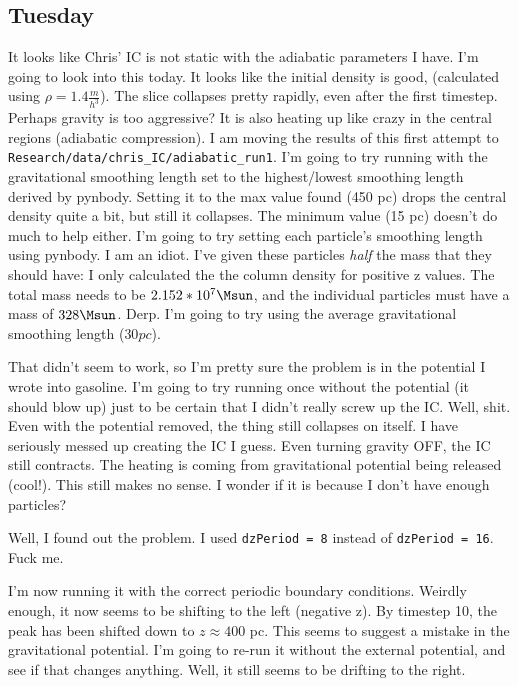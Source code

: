 \documentclass[11pt,letterpaper]{article}
\begin{document}
\subsection*{Tuesday}
It looks like Chris' IC is not static with the adiabatic parameters I have.  
I'm going to look into this today.  It looks like the initial density is good,
(calculated using $\rho = 1.4 \frac{m}{h^3}$).  The slice collapses pretty 
rapidly, even after the first timestep.  Perhaps gravity is too aggressive?  It
is also heating up like crazy in the central regions (adiabatic compression). I 
am moving the results of this first attempt to 
\verb!Research/data/chris_IC/adiabatic_run1!.  I'm going to try running with
the gravitational smoothing length set to the highest/lowest smoothing length
derived by pynbody. Setting it to the max value found (450 pc) drops the central
density quite a bit, but still it collapses.  The minimum value (15 pc) doesn't
do much to help either. I'm going to try setting each particle's smoothing length using pynbody.  I am an idiot.  I've given these particles \textit{half} the 
mass that they should have: I only calculated the the column density for 
positive z values. The total mass needs to be $2.152*10^7\Msun$, and the 
individual particles must have a mass of $328\Msun$.  Derp.  I'm going to try
using the average gravitational smoothing length ($30 pc$).

That didn't seem to work, so I'm pretty sure the problem is in the potential I
wrote into gasoline.  I'm going to try running once without the potential 
(it should blow up) just to be certain that I didn't really screw up the IC. 
Well, shit.  Even with the potential removed, the thing still collapses on 
itself.  I have seriously messed up creating the IC I guess.  Even turning 
gravity OFF, the IC still contracts.  The heating is coming from gravitational
potential being released (cool!).  This still makes no sense.  I wonder if it 
is because I don't have enough particles?

Well, I found out the problem.  I used \verb!dzPeriod = 8! instead of 
\verb!dzPeriod = 16!.  Fuck me.

I'm now running it with the correct periodic boundary conditions.  Weirdly
enough, it now seems to be shifting to the left (negative z).  By timestep 10, 
the peak has been shifted down to $z\approx 400$ pc.  This seems to suggest a
mistake in the gravitational potential. I'm going to re-run it without the 
external potential, and see if that changes anything.  Well, it still seems to
be drifting to the right.
\end{document}

